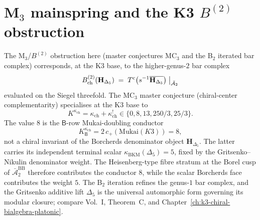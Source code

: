 \section{M\texorpdfstring{$_3$}{-3} mainspring and the K3 \texorpdfstring{$B^{(2)}$}{B-(2)} obstruction}
\label{sec:m3b2-k3-base}

\begin{remark}
\label{rem:m3b2-k3-base-correspondence}
The M$_3$/$B^{(2)}$ obstruction here (master conjectures MC$_3$ and the B$_2$
iterated bar complex) corresponds, at the K3 base, to the
higher-genus-$2$ bar complex
\[
B^{(2)}_{\mathrm{ch}}(\mathbf H_{\Delta_5}) \;=\; T^c\bigl(s^{-1}\overline{\mathbf H_{\Delta_5}}\bigr)\bigm|_{\bar{\mathcal A}_2}
\]
evaluated on the Siegel threefold. The MC$_3$ master conjecture
(chiral-center complementarity) specialises at the K3 base to
\[
K^{\kappa_{\mathrm{ch}}}
=\kappa_{\mathrm{ch}}+\kappa_{\mathrm{ch}}^!
\in \{0, 8, 13, 250/3, 25/3\}.
\]
The value \(8\) is the \(\mathsf B\)-row Mukai-doubling conductor
\[
K^{\kappa_{\mathrm{ch}}}_{\mathsf B}
  =2\,c_+(\mathrm{Mukai}(K3))=8,
\]
not a chiral invariant of the Borcherds denominator object
\(\mathbf H_{\Delta_5}\).  The latter carries its independent terminal
scalar \(\kappa_{\mathrm{BKM}}(\Delta_5)=5\), fixed by the
Gritsenko--Nikulin denominator weight.  The Heisenberg-type fibre
stratum at the Borel cusp of \(\bar{\mathcal A}_2^{\mathrm{BB}}\)
therefore contributes the conductor \(8\), while the scalar Borcherds
face contributes the weight \(5\).
The B$_2$ iteration refines the genus-$1$ bar
complex, and the Gritsenko additive lift $\Delta_5$ is the universal
automorphic form governing its modular closure; compare Vol.~I,
Theorem~C, and Chapter~\ref{ch:k3-chiral-bialgebra-platonic}.
\end{remark}

